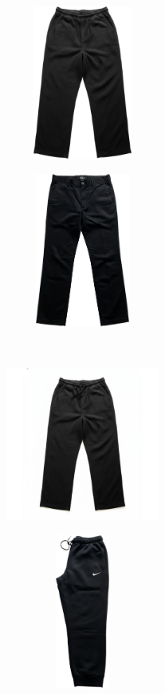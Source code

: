 \documentclass[10pt]{article}
\begin{document}
\begin{minipage}[c][50.60mm][c]{50.60mm}
\includegraphics[width=50.60mm,height=50.60mm,keepaspectratio]{assets/pants/Generative Fill.png}\
\end{minipage} \hspace*{6.00mm} \begin{minipage}[c][50.60mm][c]{50.60mm}\centering
\includegraphics[width=50.60mm,height=50.60mm,keepaspectratio]{assets/pants/black-cotton-pants.png}\
\end{minipage}\
\vspace*{6.00mm}\
\begin{minipage}[c][50.60mm][c]{50.60mm}\centering
\includegraphics[width=50.60mm,height=50.60mm,keepaspectratio]{assets/pants/black-linen-pants.png}\
\end{minipage} \hspace*{6.00mm} \begin{minipage}[c][50.60mm][c]{50.60mm}\centering
\includegraphics[width=50.60mm,height=50.60mm,keepaspectratio]{assets/pants/black-nike-soft-pants.png}\
\end{minipage}\
\vspace*{6.00mm}\
\newpage
\end{document}
